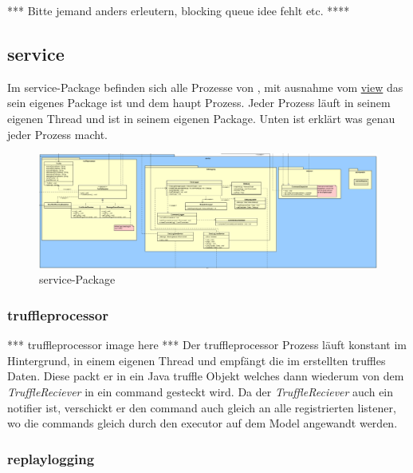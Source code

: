       *** Bitte jemand anders erleutern, blocking queue idee fehlt etc. ****


\subsection{service}
\label{subsec:service}

Im service-Package befinden sich alle Prozesse von \programname,
mit ausnahme vom \hyperref[subsec:view]{view} das sein eigenes Package ist und dem
haupt Prozess. Jeder Prozess läuft in seinem eigenen Thread und ist in seinem
eigenen Package. Unten ist erklärt was genau jeder Prozess macht.

\begin{figure}[H]
  \centering
  \includegraphics[width=\textwidth]{../diagramimages/service.png}
  \caption{service-Package}
  \medskip
\end{figure}

    \subsubsection{truffleprocessor}
    \label{subsubsec:truffleprocessor}

    *** truffleprocessor image here ***
    \newline
    \newline
    Der truffleprocessor Prozess läuft konstant im Hintergrund, in einem eigenen Thread
    und empfängt die im \sppname erstellten \glspl{truffle} Daten.
    Diese packt er in ein Java \gls{truffle} Objekt welches dann wiederum von dem
    \textit{TruffleReciever} in ein \gls{command} gesteckt wird. Da der \textit{TruffleReciever}
    auch ein \gls{notifier} ist, verschickt er den \gls{command} auch gleich an
    alle registrierten \gls{listener}, wo die \glspl{command} gleich durch den
    \gls{executor} auf dem Model angewandt werden.

    \subsubsection{replaylogging}
    \label{subsubsec:replaylogging}

